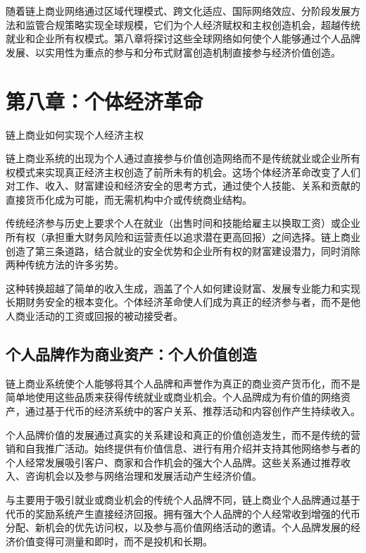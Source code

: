 \documentclass[
  Letterpaper,
]{scrbook}
\begin{document}
随着链上商业网络通过区域代理模式、跨文化适应、国际网络效应、分阶段发展方法和监管合规策略实现全球规模，它们为个人经济赋权和主权创造机会，超越传统就业和企业所有权模式。第八章将探讨这些全球网络如何使个人能够通过个人品牌发展、以实用性为重点的参与和分布式财富创造机制直接参与经济价值创造。

\chapter{第八章：个体经济革命}\label{sec-individual-economy}

链上商业如何实现个人经济主权

链上商业系统的出现为个人通过直接参与价值创造网络而不是传统就业或企业所有权模式来实现真正经济主权创造了前所未有的机会。这场个体经济革命改变了人们对工作、收入、财富建设和经济安全的思考方式，通过使个人技能、关系和贡献的直接货币化成为可能，而无需机构中介或传统商业结构。

传统经济参与历史上要求个人在就业（出售时间和技能给雇主以换取工资）或企业所有权（承担重大财务风险和运营责任以追求潜在更高回报）之间选择。链上商业创造了第三条道路，结合就业的安全优势和企业所有权的财富建设潜力，同时消除两种传统方法的许多劣势。

这种转换超越了简单的收入生成，涵盖了个人如何建设财富、发展专业能力和实现长期财务安全的根本变化。个体经济革命使人们成为真正的经济参与者，而不是他人商业活动的工资或回报的被动接受者。

\section{个人品牌作为商业资产：个人价值创造}\label{ux4e2aux4ebaux54c1ux724cux4f5cux4e3aux5546ux4e1aux8d44ux4ea7ux4e2aux4ebaux4ef7ux503cux521bux9020}

链上商业系统使个人能够将其个人品牌和声誉作为真正的商业资产货币化，而不是简单地使用这些品质来获得传统就业或商业机会。个人品牌成为有价值的网络资产，通过基于代币的经济系统中的客户关系、推荐活动和内容创作产生持续收入。

个人品牌价值的发展通过真实的关系建设和真正的价值创造发生，而不是传统的营销和自我推广活动。始终提供有价值信息、进行有用介绍并支持其他网络参与者的个人经常发展吸引客户、商家和合作机会的强大个人品牌。这些关系通过推荐收入、咨询机会以及参与网络治理和发展活动产生经济价值。

与主要用于吸引就业或商业机会的传统个人品牌不同，链上商业个人品牌通过基于代币的奖励系统产生直接经济回报。拥有强大个人品牌的个人经常收到增强的代币分配、新机会的优先访问权，以及参与高价值网络活动的邀请。个人品牌发展的经济价值变得可测量和即时，而不是投机和长期。
\end{document}
